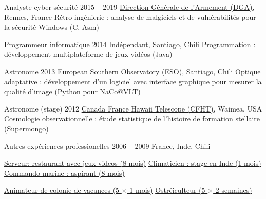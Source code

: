 \begin{joblist}[12.8][8.4][4]

\setlength{\parskip}{0.3cm}
\vspace{-0.4cm}

\item[Analyste cyber sécurité]{2015 -- 2019}
	{
  \href{http://www.defense.gouv.fr/dga/}{Direction Générale de l'Armement (DGA)}, Rennes, France
  }
  {Rétro-ingénierie : analyse de malgiciels et de vulnérabilités pour la sécurité Windows (C, Asm)}

\item[Programmeur informatique]{2014}
	{
	\href{https://tinmarino.github.io/Page/}{Indépendant}, Santiago, Chili
  }
  {Programmation : développement multiplateforme de jeux vidéos (Java)}



\item[Astronome]{2013}
	{
	\href{http://www.eso.org/public/}{European Southern Observatory (ESO)}, Santiago, Chili
	}
  {Optique adaptative : développement d'un logiciel avec interface graphique pour mesurer la qualité d'image (Python pour NaCo@VLT)}

\item[Astronome (stage)]{2012}
	{
\href{https://www.cfht.hawaii.edu/}{Canada France Hawaii Telescope (CFHT)}, Waimea, USA
  }
  {Cosmologie observationnelle : étude statistique de l'histoire de formation stellaire (Supermongo)}

\item[Autres expériences professionelles]{2006 -- 2009}
	{
	France, Inde, Chili
	}
	{
    \renewcommand\labelitemi{{}}
		\vspace{-0.8cm}
    \setlength{\parskip}{0cm}
		\begin{itemize}
		\setlength\itemsep{0cm}
    \cvitem \href{http://www.insertcoin.cl/}{ Serveur: restaurant avec jeux videos (8 mois)}
    \cvitem \href{http://www.dupont.co.in/}{ Climaticien : stage en Inde (1 mois)}
    \cvitem \href{http://www.defense.gouv.fr/marine/organisation/forces/fusiliers-marins-et-commandos/force-maritime-des-fusiliers-marins-et-commandos}{ Commando marine : aspirant (8 mois)}
	
    \cvitem \href{http://www.vacances-pour-tous.org/}{ Animateur de colonie de vacances (5 $\times$ 1 mois)}
    \cvitem \href{http://huitresdesaintvaast.fr/}{ Ostréiculteur (5 $\times$ 2 semaines)}
		\end{itemize}
  }
\end{joblist}



